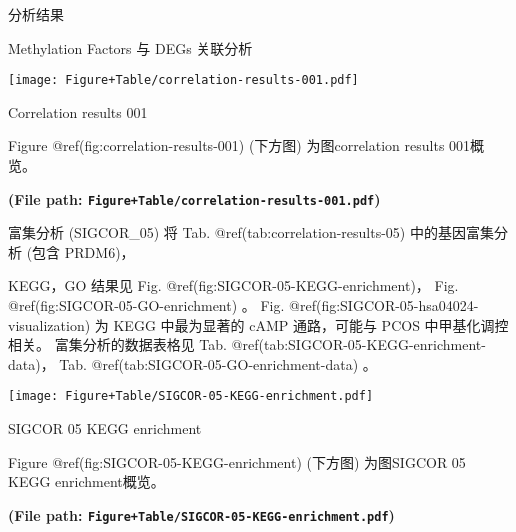 \documentclass[
  ignorenonframetext,
]{beamer}
\begin{document}
\begin{frame}[fragile]{分析结果}
\begin{block}{Methylation Factors 与 DEGs 关联分析}
\begin{center}\vspace{1.5cm}\end{center}
\def\@captype{figure}
\begin{center}
\texttt{[image: Figure+Table/correlation-results-001.pdf]}
\caption{Correlation results 001}\label{fig:correlation-results-001}
\end{center}

Figure @ref(fig:correlation-results-001) (下方图) 为图correlation
results 001概览。

\textbf{(File path: \texttt{Figure+Table/correlation-results-001.pdf})}

\begin{center}\vspace{1.5cm}\end{center}
\end{block}

\begin{block}{富集分析 (SIGCOR\_05)}
\protect\hypertarget{ux5bccux96c6ux5206ux6790-sigcor_05}{}
将 Tab. @ref(tab:correlation-results-05) 中的基因富集分析 (包含 PRDM6)，

KEGG，GO 结果见 Fig. @ref(fig:SIGCOR-05-KEGG-enrichment)， Fig.
@ref(fig:SIGCOR-05-GO-enrichment) 。 Fig.
@ref(fig:SIGCOR-05-hsa04024-visualization) 为 KEGG 中最为显著的 cAMP
通路，可能与 PCOS 中甲基化调控相关。 富集分析的数据表格见 Tab.
@ref(tab:SIGCOR-05-KEGG-enrichment-data)， Tab.
@ref(tab:SIGCOR-05-GO-enrichment-data) 。

\begin{center}\vspace{1.5cm}\end{center}
\def\@captype{figure}
\begin{center}
\texttt{[image: Figure+Table/SIGCOR-05-KEGG-enrichment.pdf]}
\caption{SIGCOR 05 KEGG enrichment}\label{fig:SIGCOR-05-KEGG-enrichment}
\end{center}

Figure @ref(fig:SIGCOR-05-KEGG-enrichment) (下方图) 为图SIGCOR 05 KEGG
enrichment概览。

\textbf{(File path:
\texttt{Figure+Table/SIGCOR-05-KEGG-enrichment.pdf})}

\begin{center}\vspace{1.5cm}\end{center}


\end{block}
\end{frame}
\end{document}
